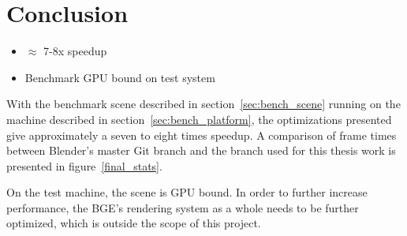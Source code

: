 \section{Conclusion}
\ifsummaries
\begin{itemize}
 \item $\approx$ 7-8x speedup
 \item Benchmark GPU bound on test system
\end{itemize}
\fi

With the benchmark scene described in section~\ref{sec:bench_scene} running on the machine described in section~\ref{sec:bench_platform}, the optimizations presented give approximately a seven to eight times speedup. A comparison of frame times between Blender's master Git branch and the branch used for this thesis work is presented in figure~\ref{final_stats}. 


On the test machine, the scene is GPU bound. In order to further increase performance, the BGE's rendering system as a whole needs to be further optimized, which is outside the scope of this project.

